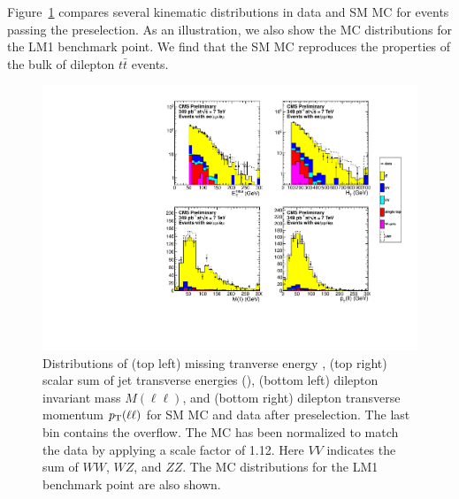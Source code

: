 
Figure~\ref{fig:bulk} compares several kinematic distributions in data and SM MC for events passing the preselection.
As an illustration, we also show the MC distributions for the LM1 benchmark point. We find that the SM MC reproduces 
the properties of the bulk of dilepton $t\bar{t}$ events. 


\begin{figure}[tbh]
\begin{center}
\includegraphics[width=1.0\linewidth]{plots_final/datamc_LM1_349pb.pdf}
\caption{\label{fig:bulk}\protect 
Distributions of (top left) missing tranverse energy \MET, (top right) scalar sum of jet transverse energies (\HT), 
(bottom left) dilepton invariant mass $M(\ell\ell)$, and (bottom right) dilepton transverse momentum $p_{\mathrm{T}}(\ell\ell)$ 
for SM MC and data after preselection. The last bin contains the overflow.
The MC has been normalized to match the data by applying a scale factor of 1.12.
Here $VV$ indicates the sum of $WW$, $WZ$, and $ZZ$. 
The MC distributions for the LM1 benchmark point are also shown.
}
\end{center}
\end{figure}
